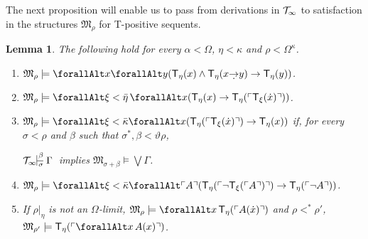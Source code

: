 \documentclass[UKenglish,cleveref,DIV=12]{scrartcl}
\let\forall\forallAlt
\newtheorem{lemma}{Lemma}
\theoremstyle{definition}
\theoremstyle{definition}
\begin{document}
The next proposition will enable us to pass from derivations in $\mathcal{T}_\infty$ to satisfaction in the structures $\mathfrak
M_{\rho}$ for T-positive sequents.
\begin{lemma}\label{extlem:T8Mprop}
 The following hold for every $\alpha<\Omega$, $\eta<\kappa$ and $\rho<\Omega^\kappa$.
 \begin{enumerate}
  \item $\mathfrak M_\rho\models\forall x\forall y( \T_\eta(x)\land
	\T_\eta(x\dimplies y) \rightarrow \T_\eta(y))$.\label{eqn:T8propii}
  \item $\mathfrak M_\rho\models \forall \xi<\bar\eta\,\forall
	x(\T_\eta(x)\rightarrow \T_\eta(\gn{\T_\xi(\dot x)}))$.\label{eqn:T8propiii}
  \item $\mathfrak M_\rho\models\forall\xi<\bar\kappa\forall
	x(\T_\eta(\gn{\T_{\xi}(\dot x)})\rightarrow \T_\eta(x))$ if, for every
	$\sigma<\rho$ and $\beta$ such that $\sigma^*,\beta<\vartheta\rho$,
	\begin{center}
	  $\Tinfty\prov\beta\sigma\Gamma$ implies $\mathfrak M_{\sigma+\beta}\models\textstyle\bigvee\Gamma$.
	\end{center}\label{eqn:T8propiv}
  \item $\mathfrak M_\rho\models\forall\xi<\bar\kappa\forall \gn A(\T_\eta(\gn{\lnot \T_{\xi}(\gn A)})\rightarrow \T_\eta(\gn{\lnot A}))$.\label{eqn:T8propv}
  \item If $\rho|_\eta$ is not an $\Omega$-limit, $\mathfrak M_\rho\models
	\forall x\,\T_\eta(\gn{A(\dot x)})$ and $\rho<^*\rho'$, $\mathfrak M_{\rho'}\models \T_\eta(\gn{\forall x\,A(x)})$.\label{eqn:T8propvi}
 \end{enumerate}
\end{lemma}
\end{document}
